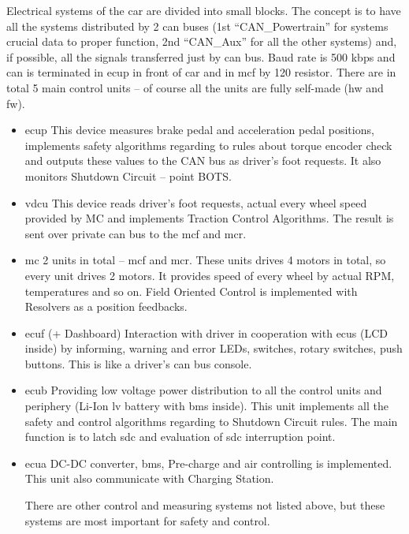 
Electrical systems of the car are divided into small blocks. The concept is to have all the systems distributed by 2 \gls{can} buses (1st “CAN\_Powertrain” for systems crucial data to proper function, 2nd “CAN\_Aux” for all the other systems) and, if possible, all the signals transferred just by \gls{can} bus. Baud rate is 500 kbps and \gls{can} is terminated in \gls{ecup} in front of car and in \gls{mcf} by 120 \ohm resistor. There are in total 5 main control units – of course all the units are fully self-made (\gls{hw} and \gls{fw}).

\begin{itemize}
\item	\acrfull{ecup}
This device measures brake pedal and acceleration pedal positions, implements safety algorithms regarding to rules about torque encoder check and outputs these values to the CAN bus as driver’s foot requests. It also monitors Shutdown Circuit – point BOTS. 

\item	\acrfull{vdcu}
This device reads driver’s foot requests, actual every wheel speed provided by MC and implements Traction Control Algorithms. The result is sent over private \gls{can} bus to the \gls{mcf} and \gls{mcr}. 

\item	\acrfull{mc}
2 units in total – \gls{mcf} and \gls{mcr}. These units drives 4 motors in total, so every unit drives 2 motors. It provides speed of every wheel by actual RPM, temperatures and so on. Field Oriented Control is implemented with Resolvers as a position feedbacks.

\item	\acrfull{ecuf} (+ Dashboard)
Interaction with driver in cooperation with \gls{ecus} (LCD inside) by informing, warning and error LEDs, switches, rotary switches, push buttons. This is like a driver’s \gls{can} bus console. 

\item	\acrfull{ecub}
Providing low voltage power distribution to all the control units and periphery (Li-Ion \gls{lv} battery with \gls{bms} inside). This unit implements all the safety and control algorithms regarding to Shutdown Circuit rules. The main function is to latch \gls{sdc} and evaluation of \gls{sdc} interruption point. 

\item	\acrfull{ecua}
DC-DC converter, \gls{bms}, Pre-charge and \gls{air} controlling is implemented. This unit also communicate with Charging Station.

There are other control and measuring systems not listed above, but these systems are most important for safety and control.

\end{itemize}


